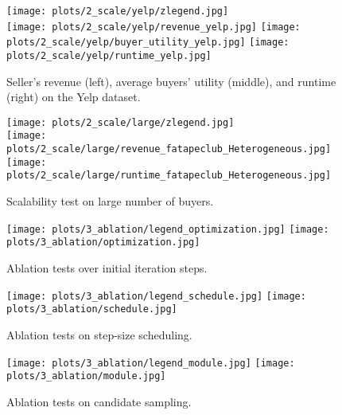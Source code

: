 \documentclass[conference]{IEEEtran}
\theoremstyle{plain}
\begin{document}
\begin{figure*}[t!]
    \centering
    \begin{minipage}[t]{.48\textwidth}
    \centering
    \texttt{[image: plots/2\_scale/yelp/zlegend.jpg]}\\
    \texttt{[image: plots/2\_scale/yelp/revenue\_yelp.jpg]}
    \texttt{[image: plots/2\_scale/yelp/buyer\_utility\_yelp.jpg]}
    \texttt{[image: plots/2\_scale/yelp/runtime\_yelp.jpg]}
    \caption{Seller's revenue (left), average buyers' utility (middle), and runtime (right) on the Yelp dataset.}
    \label{fig:yelp-results}
\end{minipage}
    \hfill
    \begin{minipage}[t]{.48\textwidth}
    \centering
    \texttt{[image: plots/2\_scale/large/zlegend.jpg]}\\
    \hfill
    \texttt{[image: plots/2\_scale/large/revenue\_fatapeclub\_Heterogeneous.jpg]}
    \quad
    \texttt{[image: plots/2\_scale/large/runtime\_fatapeclub\_Heterogeneous.jpg]}
    \hfill
    \vspace{-2mm}
    \caption{Scalability test on large number of buyers.}
    \label{fig:scale}
\end{minipage}
    \vspace{-2mm}
\end{figure*}

\begin{figure*}[ht]
    \centering
    \begin{minipage}[t]{.3\textwidth}
        \centering
        \texttt{[image: plots/3\_ablation/legend\_optimization.jpg]}
        \texttt{[image: plots/3\_ablation/optimization.jpg]}
        \caption{Ablation tests over initial iteration steps.}
        \label{fig:barplot-ablation-main}
    \end{minipage}
    \hfill
    \begin{minipage}[t]{.3\textwidth}
        \centering
        \texttt{[image: plots/3\_ablation/legend\_schedule.jpg]}
        \texttt{[image: plots/3\_ablation/schedule.jpg]}
        \caption{Ablation tests on step-size scheduling.}
        \label{fig:ablation-schedule}
    \end{minipage}
    \hfill
    \begin{minipage}[t]{.3\textwidth}
        \centering
        \texttt{[image: plots/3\_ablation/legend\_module.jpg]}
        \texttt{[image: plots/3\_ablation/module.jpg]}
        \caption{Ablation tests on candidate sampling.}
        \label{fig:ablation-module}
    \end{minipage}
    \vspace{-4mm}
\end{figure*}
\end{document}
